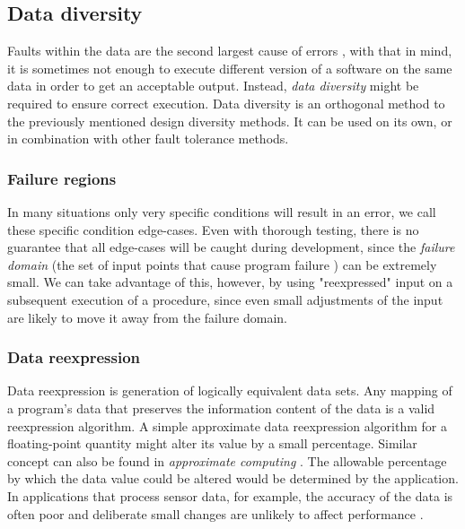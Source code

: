 \subsection{Data diversity}

Faults within the data are the second largest cause of errors \cite{nasa:stats}, with that in mind, it is sometimes not enough to execute different version of a software on the same data in order to get an acceptable output. Instead, \textit{data diversity} \cite{nasa:datadiversity} might be required to ensure correct execution. Data diversity is an orthogonal method to the previously mentioned design diversity methods. It can be used on its own, or in combination with other fault tolerance methods.

\subsubsection{Failure regions}

In many situations only very specific conditions will result in an error, we call these specific condition edge-cases. Even with thorough testing, there is no guarantee that all edge-cases will be caught during development, since the \textit{failure domain} (the set of input points that cause program failure \cite{dd:sft}) can be extremely small. We can take advantage of this, however, by using "reexpressed" input on a subsequent execution of a procedure, since even small adjustments of the input are likely to move it away from the failure domain. 
 
\subsubsection{Data reexpression}

Data reexpression is generation of logically equivalent data sets. Any mapping of a program's data that preserves the information content of the data is a valid reexpression algorithm. A simple approximate data reexpression algorithm for a floating-point quantity might alter its value by a small percentage. Similar concept can also be found in \textit{approximate computing} \cite{approxcomp}. The allowable percentage by which the data value could be altered would be determined by the application. In applications that process sensor data, for example, the accuracy of the data is often poor and deliberate small changes are unlikely to affect performance \cite{nasa:datadiversity}. 

